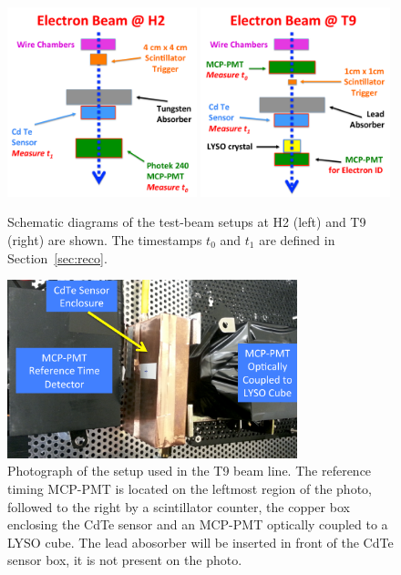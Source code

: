 \begin{figure}[htbp] 
\centering
\includegraphics[width=0.49\textwidth]{figures/H2_BeamSchematicDiagram.pdf} 
\includegraphics[width=0.49\textwidth]{figures/T9_BeamSchematicDiagram.pdf} 
\caption{Schematic diagrams of the test-beam setups at H2 (left) and T9 (right) are shown. 
The timestamps $t_0$ and $t_1$ are defined in Section~\ref{sec:reco}.} 
\label{fig:BeamSchematicDiagram} 
\end{figure} 

\begin{figure}[htbp] 
\centering
\includegraphics[width=0.75\textwidth]{figures/T9SetupPhoto.pdf} 
\caption{ Photograph of the setup used in the T9 beam line. The reference timing MCP-PMT 
is located on the leftmost region of the photo, followed to the right by a scintillator counter, 
the copper box enclosing the CdTe sensor and an MCP-PMT optically coupled to a LYSO cube. The lead abosorber will be inserted in front of the CdTe sensor box, it is not present on the photo.} 
\label{fig:SetupPhoto} 
\end{figure} 


